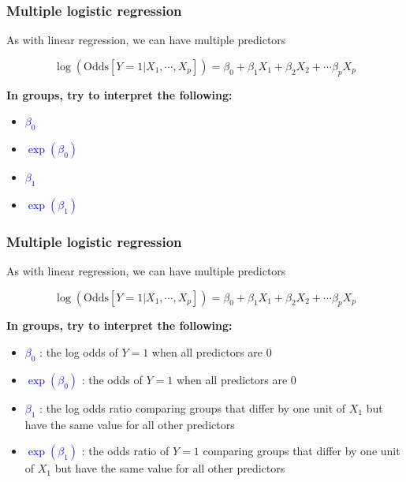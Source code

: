 \documentclass[10pt,t]{beamer}
\begin{document}
\begin{frame}
	\frametitle{Multiple logistic regression}
	
	\vspace{-5 mm}
	
	As with linear regression, we can have multiple predictors
	\medskip
	
	$$\log\left(\text{Odds}[Y =1 |X_1,\cdots,X_p]\right) = \beta_0 + \beta_1 X_1 + \beta_2X_2 + \cdots \beta_p X_p$$
	
	\medskip
	
	\textbf{In groups, try to interpret the following:}
	\medskip
	
	\begin{itemize}
		\item \textcolor{blue}{$\beta_0$}
		\medskip
		\item \textcolor{blue}{$\exp(\beta_0)$}
		\medskip
		\item \textcolor{blue}{$\beta_1$}
		\medskip
		\item \textcolor{blue}{$\exp(\beta_1)$}
	\end{itemize}
\end{frame}

\begin{frame}
	\frametitle{Multiple logistic regression}
	
	\vspace{-5 mm}
	
	As with linear regression, we can have multiple predictors
	\medskip
	
	$$\log\left(\text{Odds}[Y =1 |X_1,\cdots,X_p]\right) = \beta_0 + \beta_1 X_1 + \beta_2X_2 + \cdots \beta_p X_p$$
	
	\medskip
	
	\textbf{In groups, try to interpret the following:}
	\medskip
	
	\begin{itemize}
		\item \textcolor{blue}{$\beta_0$} : the log odds of $Y=1$ when all predictors are 0
		\medskip
		\item \textcolor{blue}{$\exp(\beta_0)$} : the odds of $Y=1$ when all predictors are 0
		\medskip
		
		\item \textcolor{blue}{$\beta_1$} : the log odds ratio comparing groups that differ by one unit of $X_1$ but have the same value for all other predictors
		
		\medskip
		\item \textcolor{blue}{$\exp(\beta_1)$} : the odds ratio of $Y=1$ comparing groups that differ by one unit of $X_1$ but have the same value for all other predictors
	\end{itemize}
\end{frame}
\end{document}
